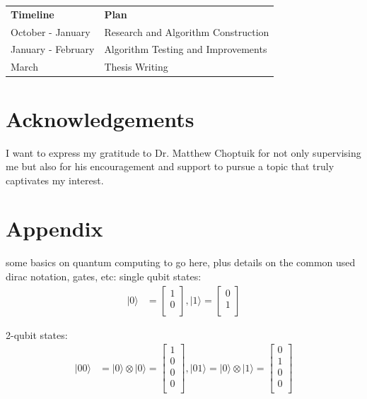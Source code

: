 \documentclass[twocolumn,showpacs,preprintnumbers,amsmath,amssymb]{revtex4}
\begin{document}
		\begin{table}[!h]
			\begin{tabular}{ll}
				\textbf{Timeline}  & \textbf{Plan}                       \\
				October - January  & Research and Algorithm Construction \\
				January - February & Algorithm Testing and Improvements  \\
				March              & Thesis Writing                     
			\end{tabular}
		\end{table}
		
		\section{Acknowledgements}
		
		I want to express my gratitude to Dr. Matthew Choptuik for not only supervising me but also 
		for his encouragement and support to pursue a topic that truly captivates my interest.
		
		\section{Appendix}
		
		some basics on quantum computing to go here, plus details on the common used dirac notation, gates, etc:
		single qubit states: 
		\begin{align*}	
			|0\rangle &= \begin{bmatrix}
				1 \\
				0 \\
			\end{bmatrix}, 
		    |1\rangle = \begin{bmatrix}
				0 \\
				1 \\
			\end{bmatrix}
		\end{align*}
		
		2-qubit states: 
		\begin{align*}	
			|00\rangle &= |0\rangle \otimes |0\rangle = \begin{bmatrix}
				1 \\
				0 \\
				0 \\
				0 \\
			\end{bmatrix}, 
			|01\rangle = |0\rangle \otimes |1\rangle = \begin{bmatrix}
				0 \\
				1 \\
				0 \\
				0 \\
			\end{bmatrix} 			
		\end{align*}
		
\end{document}
